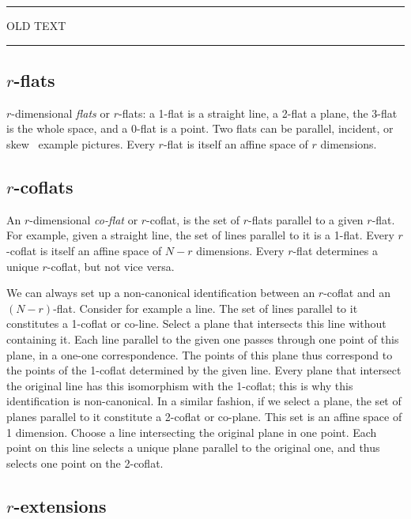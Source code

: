 \documentclass[\ifafour a4paper,12pt,\else a5paper,10pt,\fi%
onecolumn,oneside,article,%
british%
]{memoir}
\theoremstyle{remark}
\theoremstyle{innote}
\renewcommand*{\|}{\nonscript\,\vert\nonscript\;\mathopen{}}
\newcommand*{\puzzle}{{\fontencoding{U}\fontfamily{fontawesometwo}\selectfont\symbol{225}}}
\newcommand{\mynote}[1]{ {\color{notecolour}\puzzle\ #1}}
\newcommand*{\+}{\boxplus}
\newcommand*{\yr}{r}
\newcommand*{\yN}{N}
\begin{document}
\clearpage

\hrule
OLD TEXT
\hrule
\bigskip

\subsection{$\yr$-flats}
\label{sec:flats}

$\yr$-dimensional \emph{flats} or $\yr$-flats: a 1-flat is a straight line,
a 2-flat a plane, the 3-flat is the whole space, and a 0-flat is a point.
Two flats can be parallel, incident, or skew \mynote{example pictures}.
Every $\yr$-flat is itself an affine space of $\yr$ dimensions.

\subsection{$\yr$-coflats}
\label{sec:coflats}

An $\yr$-dimensional \emph{co-flat} or $\yr$-coflat, is the set of
$\yr$-flats parallel to a given $\yr$-flat. For example, given a straight
line, the set of lines parallel to it is a 1-flat. Every $\yr$-coflat is
itself an affine space of $\yN-\yr$ dimensions. Every $\yr$-flat determines
a unique $\yr$-coflat, but not vice versa.

We can always set up a non-canonical identification between an $\yr$-coflat
and an $(\yN-\yr)$-flat. Consider for example a line. The set of lines
parallel to it constitutes a 1-coflat or co-line. Select a plane that
intersects this line without containing it. Each line parallel to the given
one passes through one point of this plane, in a one-one correspondence.
The points of this plane thus correspond to the points of the 1-coflat
determined by the given line. Every plane that intersect the original line
has this isomorphism with the 1-coflat; this is why this identification is
non-canonical. In a similar fashion, if we select a plane, the set of
planes parallel to it constitute a 2-coflat or co-plane. This set is an
affine space of 1 dimension. Choose a line intersecting the original plane
in one point. Each point on this line selects a unique plane parallel to
the original one, and thus selects one point on the 2-coflat.


\subsection{$\yr$-extensions}
\label{sec:extensions}
\end{document}
